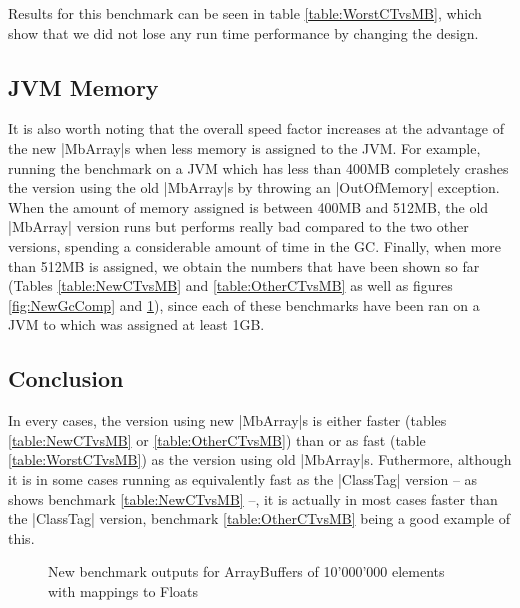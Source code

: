 Results for this benchmark can be seen in table \ref{table:WorstCTvsMB}, which show that we did not lose any run time performance by changing the design.

\subsection{JVM Memory}

It is also worth noting that the overall speed factor increases at the advantage of the new |MbArray|s when less memory is assigned to the JVM. For example, running the benchmark on a JVM which has less than 400MB completely crashes the version using the old |MbArray|s by throwing an |OutOfMemory| exception. When the amount of memory assigned is between 400MB and 512MB, the old |MbArray| version runs but performs really bad compared to the two other versions, spending a considerable amount of time in the GC. Finally, when more than 512MB is assigned, we obtain the numbers that have been shown so far (Tables \ref{table:NewCTvsMB} and \ref{table:OtherCTvsMB} as well as figures \ref{fig:NewGcComp} and \ref{fig:OtherGcComp}), since each of these benchmarks have been ran on a JVM to which was assigned at least 1GB.

\subsection{Conclusion}

In every cases, the version using new |MbArray|s is either faster (tables \ref{table:NewCTvsMB} or \ref{table:OtherCTvsMB}) than or as fast (table \ref{table:WorstCTvsMB}) as the version using old |MbArray|s. Futhermore, although it is in some cases running as equivalently fast as the |ClassTag| version -- as shows benchmark \ref{table:NewCTvsMB} --, it is actually in most cases faster than the |ClassTag| version, benchmark \ref{table:OtherCTvsMB} being a good example of this. 



\begin{figure}
\caption{New benchmark outputs for ArrayBuffers of 10'000'000 elements with mappings to Floats}
\label{fig:OtherGcComp}
\end{figure}

